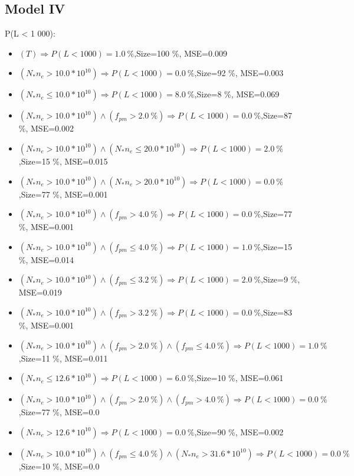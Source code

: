 \documentclass[numbered]{CSL}
\begin{document}
\subsection{Model IV}
P(L < 1 000):
\begin{itemize}
\item $(T) \Rightarrow P(L < 1 000) = 1.0~\%$,\hfill Size=100 \%, MSE=0.009
\item $(N_* n_e > 10.0 * 10^{10}) \Rightarrow P(L < 1 000) = 0.0~\%$,\hfill Size=92 \%, MSE=0.003
\item $(N_* n_e \leq 10.0 * 10^{10}) \Rightarrow P(L < 1 000) = 8.0~\%$,\hfill Size=8 \%, MSE=0.069
\item $(N_* n_e > 10.0 * 10^{10}) \land (f_{pm} > 2.0~\%) \Rightarrow P(L < 1 000) = 0.0~\%$,\hfill Size=87 \%, MSE=0.002
\item $(N_* n_e > 10.0 * 10^{10}) \land (N_* n_e \leq 20.0 * 10^{10}) \Rightarrow P(L < 1 000) = 2.0~\%$,\hfill Size=15 \%, MSE=0.015
\item $(N_* n_e > 10.0 * 10^{10}) \land (N_* n_e > 20.0 * 10^{10}) \Rightarrow P(L < 1 000) = 0.0~\%$,\hfill Size=77 \%, MSE=0.001
\item $(N_* n_e > 10.0 * 10^{10}) \land (f_{pm} > 4.0~\%) \Rightarrow P(L < 1 000) = 0.0~\%$,\hfill Size=77 \%, MSE=0.001
\item $(N_* n_e > 10.0 * 10^{10}) \land (f_{pm} \leq 4.0~\%) \Rightarrow P(L < 1 000) = 1.0~\%$,\hfill Size=15 \%, MSE=0.014
\item $(N_* n_e > 10.0 * 10^{10}) \land (f_{pm} \leq 3.2~\%) \Rightarrow P(L < 1 000) = 2.0~\%$,\hfill Size=9 \%, MSE=0.019
\item $(N_* n_e > 10.0 * 10^{10}) \land (f_{pm} > 3.2~\%) \Rightarrow P(L < 1 000) = 0.0~\%$,\hfill Size=83 \%, MSE=0.001
\item $(N_* n_e > 10.0 * 10^{10}) \land (f_{pm} > 2.0~\%) \land (f_{pm} \leq 4.0~\%) \Rightarrow P(L < 1 000) = 1.0~\%$,\hfill Size=11 \%, MSE=0.011
\item $(N_* n_e \leq 12.6 * 10^{10}) \Rightarrow P(L < 1 000) = 6.0~\%$,\hfill Size=10 \%, MSE=0.061
\item $(N_* n_e > 10.0 * 10^{10}) \land (f_{pm} > 2.0~\%) \land (f_{pm} > 4.0~\%) \Rightarrow P(L < 1 000) = 0.0~\%$,\hfill Size=77 \%, MSE=0.0
\item $(N_* n_e > 12.6 * 10^{10}) \Rightarrow P(L < 1 000) = 0.0~\%$,\hfill Size=90 \%, MSE=0.002
\item $(N_* n_e > 10.0 * 10^{10}) \land (f_{pm} \leq 4.0~\%) \land (N_* n_e > 31.6 * 10^{10}) \Rightarrow P(L < 1 000) = 0.0~\%$,\hfill Size=10 \%, MSE=0.0

\end{itemize}
\end{document}
